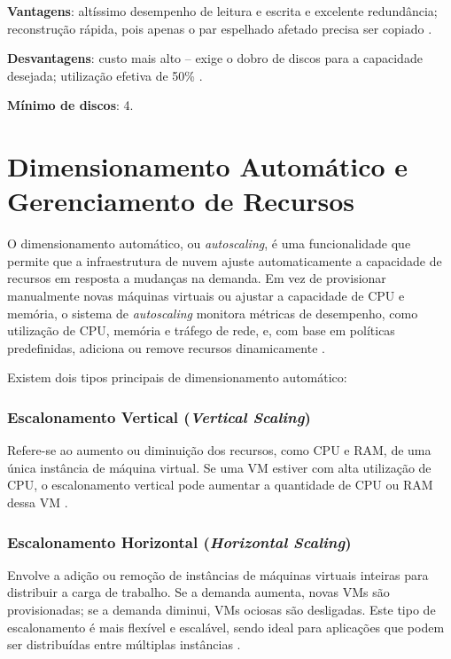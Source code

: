 \textbf{Vantagens}: altíssimo desempenho de leitura e escrita e excelente redundância; reconstrução rápida, pois apenas o par espelhado afetado precisa ser copiado \cite{techtarget2023}.

\textbf{Desvantagens}: custo mais alto – exige o dobro de discos para a capacidade desejada; utilização efetiva de 50\% \cite{techtarget2023}.

\textbf{Mínimo de discos}: 4.

\section{Dimensionamento Automático e Gerenciamento de Recursos}
\label{sec:dimensionamento_automatico}

O dimensionamento automático, ou \textit{autoscaling}, é uma funcionalidade que permite que a infraestrutura de nuvem ajuste automaticamente a capacidade de recursos em resposta a mudanças na demanda. Em vez de provisionar manualmente novas máquinas virtuais ou ajustar a capacidade de CPU e memória, o sistema de \textit{autoscaling} monitora métricas de desempenho, como utilização de CPU, memória e tráfego de rede, e, com base em políticas predefinidas, adiciona ou remove recursos dinamicamente %
.

Existem dois tipos principais de dimensionamento automático:

\subsubsection*{Escalonamento Vertical (\textit{Vertical Scaling})}
Refere-se ao aumento ou diminuição dos recursos, como CPU e RAM, de uma única instância de máquina virtual. Se uma VM estiver com alta utilização de CPU, o escalonamento vertical pode aumentar a quantidade de CPU ou RAM dessa VM \cite{murthy2014, pazynin2024}.

\subsubsection*{Escalonamento Horizontal (\textit{Horizontal Scaling})}
Envolve a adição ou remoção de instâncias de máquinas virtuais inteiras para distribuir a carga de trabalho. Se a demanda aumenta, novas VMs são provisionadas; se a demanda diminui, VMs ociosas são desligadas. Este tipo de escalonamento é mais flexível e escalável, sendo ideal para aplicações que podem ser distribuídas entre múltiplas instâncias \cite{murthy2014, pazynin2024}.

